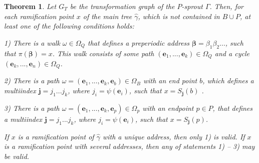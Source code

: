 \documentclass[11pt,reqno]{amsart}
\newtheorem{theorem}{Theorem}[section]
\newcommand{\be}{{\bm e}}
\newcommand{\bj}{{\bm j}}
\begin{document}
\begin{theorem}\label{radr}
    Let $G_T$ be the transformation graph of the $P$-sprout $\Gamma$. Then, for each ramification point $x$ of the main tree $\hat{\gamma}$, which is not contained in $B\cup P$, at least one of the following conditions holds:

1) There is a walk $\omega \in \Omega_Q$ that defines a preperiodic address ${\bm\beta}=\beta_1\beta_2...$,  such that $\pi({\bm\beta})=x$. This walk consists of some path $(\be_1,...,\be_k)\in \Omega_Q$ and a cycle
$(\be_k,...,\be_n)\in \Omega_Q$.

    
2) There is a path $\omega=(\be_1,...,\be_k,\be_b)\in \Omega_B$ with an end point $b$, which defines a multiindex $\bj=j_1...j_k$, where  $j_i=\psi(\be_i)$, such that  
    $x = S_{\bj}(b)$ .
    
3) There is a path $\omega=(\be_1,...,\be_k,\be_p)\in \Omega_p$ with an endpoint $p\in P$, that defines a multiindex $\bj=j_1...j_k$, where  $j_i=\psi(\be_i)$, such that  
    $x = S_\bj(p)$.




If $x$ is a ramification point of $\hat{\gamma}$ with a unique address, then only  1) is valid.
If $x$ is a ramification point with several addresses, then any of  statements 1) -- 3) may be valid.
\end{theorem}
\end{document}
